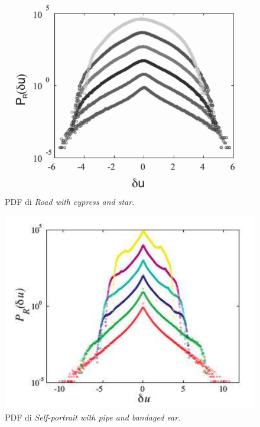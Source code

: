 \documentclass[12pt,a4paper]{article}
\numberwithin{equation}{section}
\begin{document}
\begin{figure}
    \centering
    \includegraphics[scale=0.4]{PDF_road.png}
    \caption{PDF di \emph{Road with cypress and star}.}
    \label{roadpdf}
\end{figure}

\begin{figure}
    \centering
    \includegraphics[scale=0.4]{PDF_self_portrait.png}
    \caption{PDF di \emph{Self-portrait with pipe and bandaged ear}.}
    \label{selfpdf}
\end{figure}

\end{document}

